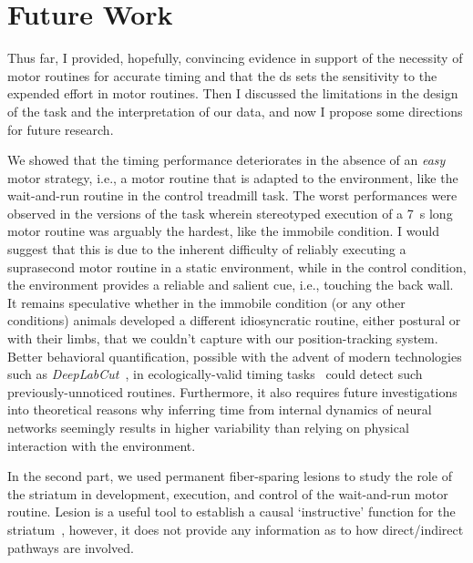 \section{Future Work}
Thus far, I provided, hopefully, convincing evidence in support of the necessity of motor routines for accurate timing and that the \gls{ds} sets the sensitivity to the expended effort in motor routines.
Then I discussed the limitations in the design of the task and the interpretation of our data, and now I propose some directions for future research.
\par
We showed that the timing performance deteriorates in the absence of an \textit{easy} motor strategy, i.e., a motor routine that is adapted to the environment, like the wait-and-run routine in the control treadmill task.
The worst performances were observed in the versions of the task wherein stereotyped execution of a 7~s long motor routine was arguably the hardest, like the immobile condition.
I would suggest that this is due to the inherent difficulty of reliably executing a suprasecond motor routine in a static environment, while in the control condition, the environment provides a reliable and salient cue, i.e., touching the back wall.
It remains speculative whether in the immobile condition (or any other conditions) animals developed a different idiosyncratic routine, either postural or with their limbs, that we couldn't capture with our position-tracking system.
Better behavioral quantification, possible with the advent of modern technologies such as \textit{DeepLabCut}~\cite{DeepLabCut2018NN}, in ecologically-valid timing tasks~\cite{VanRijn2018TICS} could detect such previously-unnoticed routines.
Furthermore, it also requires future investigations into theoretical reasons why inferring time from internal dynamics of neural networks seemingly results in higher variability than relying on physical interaction with the environment.
\par
In the second part, we used permanent fiber-sparing lesions to study the role of the striatum in development, execution, and control of the wait-and-run motor routine.
Lesion is a useful tool to establish a causal `instructive' function for the striatum~\cite{Otchy2015Nature}, however, it does not provide any information as to how direct/indirect pathways are involved.
